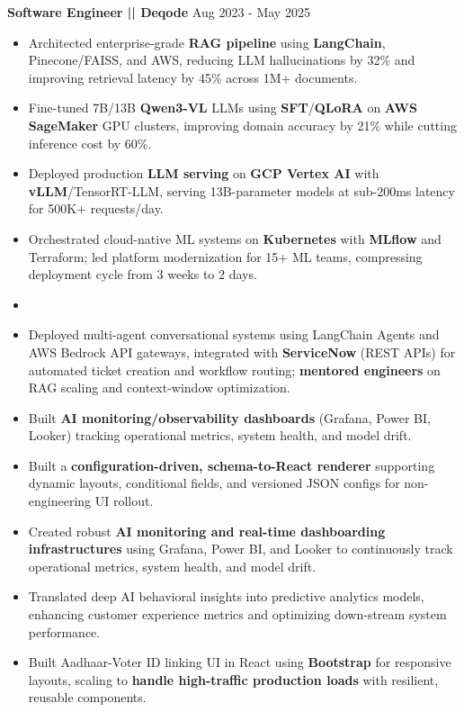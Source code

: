 \documentclass[a4paper]{article}
\begin{document}
\vspace{4pt}
\textbf{Software Engineer || Deqode}
\hfill Aug 2023 - May 2025
\begin{itemize}
\vspace{1pt}
\item {Architected enterprise-grade \textbf{RAG pipeline} using \textbf{LangChain}, Pinecone/FAISS, and AWS, reducing LLM hallucinations by 32\% and improving retrieval latency by 45\% across 1M+ documents.}
\item {Fine-tuned 7B/13B \textbf{Qwen3-VL} LLMs using \textbf{SFT}/\textbf{QLoRA} on \textbf{AWS SageMaker} GPU clusters, improving domain accuracy by 21\% while cutting inference cost by 60\%.}
\item {Deployed production \textbf{LLM serving} on \textbf{GCP Vertex AI} with \textbf{vLLM}/TensorRT-LLM, serving 13B-parameter models at sub-200ms latency for 500K+ requests/day.}
\item {Orchestrated cloud-native ML systems on \textbf{Kubernetes} with \textbf{MLflow} and Terraform; led platform modernization for 15+ ML teams, compressing deployment cycle from 3 weeks to 2 days.}
\item \item {Deployed multi-agent conversational systems using LangChain Agents and AWS Bedrock API gateways, integrated with \textbf{ServiceNow} (REST APIs) for automated ticket creation and workflow routing; \textbf{mentored engineers} on RAG scaling and context-window optimization.}
\item {Built \textbf{AI monitoring/observability dashboards} (Grafana, Power BI, Looker) tracking operational metrics, system health, and model drift.}
\item {Built a \textbf{configuration-driven, schema-to-React renderer} supporting dynamic layouts, conditional fields, and versioned JSON configs for non-engineering UI rollout.}
\item {Created robust \textbf{AI monitoring and real-time dashboarding infrastructures} using Grafana, Power BI, and Looker to continuously track operational metrics, system health, and model drift.}
\item {Translated deep AI behavioral insights into predictive analytics models, enhancing customer experience metrics and optimizing down-stream system performance.}
\item {Built Aadhaar-Voter ID linking UI in React using \textbf{Bootstrap} for responsive layouts, scaling to \textbf{handle high-traffic production loads} with resilient, reusable components.}

\end{itemize}
\end{document}
